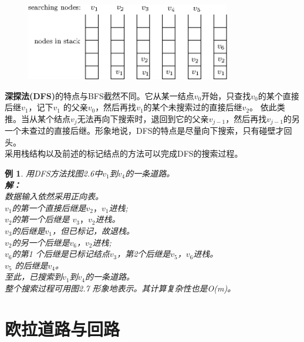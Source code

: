 \documentclass[11pt,a4paper,openany]{book}
\newtheorem{sample}{\textbf{例}}[section]
\begin{document}
\begin{figure}[h]
  \centering
  \vspace{-10pt}
  \includegraphics[width=0.8\textwidth]{2_6DFS.eps}
  \caption{}\label{fig:2.7}\vspace{-10pt}
\end{figure}
\indent \textbf{深探法(DFS)}的特点与BFS截然不同。它从某一结点$v_0$开始，只查找$v_0$的某个直接后继$v_1$，记下$v_1$ 的父亲$v_0$，然后再找$v_1$的某个未搜索过的直接后继$v_2$。 依此类推。当从某个结点$v_j$无法再向下搜索时，退回到它的父亲$v_{j-1}$，然后再找$v_{j-1}$的另一个未查过的直接后继。形象地说，DFS的特点是尽量向下搜索，只有碰壁才回头。\\
\indent 采用栈结构以及前述的标记结点的方法可以完成DFS的搜索过程。\\
\begin{sample}\K
用DFS方法找图2.6中$v_1$到$v_4$的一条道路。\\
 \textbf{解：}\\
 数据输入依然采用正向表。\\
 $v_1$的第一个直接后继是$v_2，v_1$进栈;\\
 $v_2$的第一个后继是 $v_3，v_2$进栈。\\
 $v_3$的后继是$v_1$，但已标记，故退栈。\\
 $v_2$的另一个后继是$v_6$，$v_2$进栈;\\
 $v_6$的第1 个后继是已标记结点$v_3$，第2个后继是$v_5$，$v_6$进栈。\\
 $v_5$ 的后继是$v_4$。\\
 至此，已搜索到$v_1$到$v_4$的一条道路。\\
 整个搜索过程可用图2.7 形象地表示。其计算复杂性也是O(m)。
\end{sample}
\section{欧拉道路与回路}
\end{document}
